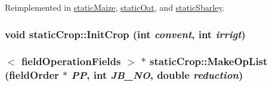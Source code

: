 Reimplemented in \hyperlink{classstatic_maize_a4b48acc64147a6c46ee154570c65b2fe}{staticMaize}, \hyperlink{classstatic_oat_a75f86a415aa54352870606818273fd94}{staticOat}, and \hyperlink{classstatic_sbarley_a0d32acc147f8af10e83d0292396db1d2}{staticSbarley}.\hypertarget{classstatic_crop_a695a960ba205046a899afa6e7f9fcee7}{
\subsubsection[{InitCrop}]{\setlength{\rightskip}{0pt plus 5cm}void staticCrop::InitCrop (int {\em convent}, \/  int {\em irrigt})}}
\label{classstatic_crop_a695a960ba205046a899afa6e7f9fcee7}
\hypertarget{classstatic_crop_a9b67ef1ae531a3afb32b63a4aeb5916b}{
\subsubsection[{MakeOpList}]{$<$ {\bf fieldOperationFields} $>$ $\ast$ staticCrop::MakeOpList ({\bf fieldOrder} $\ast$ {\em PP}, \/  int {\em JB\_\-NO}, \/  double {\em reduction})}}
\label{classstatic_crop_a9b67ef1ae531a3afb32b63a4aeb5916b}


